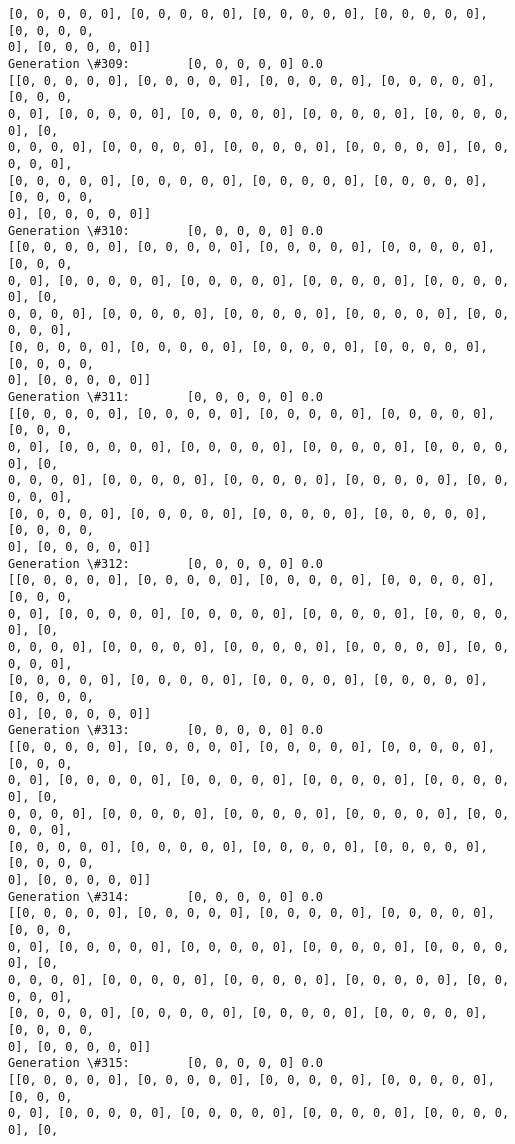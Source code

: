 \documentclass[11pt]{article}
\begin{document}
\begin{Verbatim}[commandchars=\\\{\}]
[0, 0, 0, 0, 0], [0, 0, 0, 0, 0], [0, 0, 0, 0, 0], [0, 0, 0, 0, 0], [0, 0, 0, 0,
0], [0, 0, 0, 0, 0]]
Generation \#309:        [0, 0, 0, 0, 0] 0.0
[[0, 0, 0, 0, 0], [0, 0, 0, 0, 0], [0, 0, 0, 0, 0], [0, 0, 0, 0, 0], [0, 0, 0,
0, 0], [0, 0, 0, 0, 0], [0, 0, 0, 0, 0], [0, 0, 0, 0, 0], [0, 0, 0, 0, 0], [0,
0, 0, 0, 0], [0, 0, 0, 0, 0], [0, 0, 0, 0, 0], [0, 0, 0, 0, 0], [0, 0, 0, 0, 0],
[0, 0, 0, 0, 0], [0, 0, 0, 0, 0], [0, 0, 0, 0, 0], [0, 0, 0, 0, 0], [0, 0, 0, 0,
0], [0, 0, 0, 0, 0]]
Generation \#310:        [0, 0, 0, 0, 0] 0.0
[[0, 0, 0, 0, 0], [0, 0, 0, 0, 0], [0, 0, 0, 0, 0], [0, 0, 0, 0, 0], [0, 0, 0,
0, 0], [0, 0, 0, 0, 0], [0, 0, 0, 0, 0], [0, 0, 0, 0, 0], [0, 0, 0, 0, 0], [0,
0, 0, 0, 0], [0, 0, 0, 0, 0], [0, 0, 0, 0, 0], [0, 0, 0, 0, 0], [0, 0, 0, 0, 0],
[0, 0, 0, 0, 0], [0, 0, 0, 0, 0], [0, 0, 0, 0, 0], [0, 0, 0, 0, 0], [0, 0, 0, 0,
0], [0, 0, 0, 0, 0]]
Generation \#311:        [0, 0, 0, 0, 0] 0.0
[[0, 0, 0, 0, 0], [0, 0, 0, 0, 0], [0, 0, 0, 0, 0], [0, 0, 0, 0, 0], [0, 0, 0,
0, 0], [0, 0, 0, 0, 0], [0, 0, 0, 0, 0], [0, 0, 0, 0, 0], [0, 0, 0, 0, 0], [0,
0, 0, 0, 0], [0, 0, 0, 0, 0], [0, 0, 0, 0, 0], [0, 0, 0, 0, 0], [0, 0, 0, 0, 0],
[0, 0, 0, 0, 0], [0, 0, 0, 0, 0], [0, 0, 0, 0, 0], [0, 0, 0, 0, 0], [0, 0, 0, 0,
0], [0, 0, 0, 0, 0]]
Generation \#312:        [0, 0, 0, 0, 0] 0.0
[[0, 0, 0, 0, 0], [0, 0, 0, 0, 0], [0, 0, 0, 0, 0], [0, 0, 0, 0, 0], [0, 0, 0,
0, 0], [0, 0, 0, 0, 0], [0, 0, 0, 0, 0], [0, 0, 0, 0, 0], [0, 0, 0, 0, 0], [0,
0, 0, 0, 0], [0, 0, 0, 0, 0], [0, 0, 0, 0, 0], [0, 0, 0, 0, 0], [0, 0, 0, 0, 0],
[0, 0, 0, 0, 0], [0, 0, 0, 0, 0], [0, 0, 0, 0, 0], [0, 0, 0, 0, 0], [0, 0, 0, 0,
0], [0, 0, 0, 0, 0]]
Generation \#313:        [0, 0, 0, 0, 0] 0.0
[[0, 0, 0, 0, 0], [0, 0, 0, 0, 0], [0, 0, 0, 0, 0], [0, 0, 0, 0, 0], [0, 0, 0,
0, 0], [0, 0, 0, 0, 0], [0, 0, 0, 0, 0], [0, 0, 0, 0, 0], [0, 0, 0, 0, 0], [0,
0, 0, 0, 0], [0, 0, 0, 0, 0], [0, 0, 0, 0, 0], [0, 0, 0, 0, 0], [0, 0, 0, 0, 0],
[0, 0, 0, 0, 0], [0, 0, 0, 0, 0], [0, 0, 0, 0, 0], [0, 0, 0, 0, 0], [0, 0, 0, 0,
0], [0, 0, 0, 0, 0]]
Generation \#314:        [0, 0, 0, 0, 0] 0.0
[[0, 0, 0, 0, 0], [0, 0, 0, 0, 0], [0, 0, 0, 0, 0], [0, 0, 0, 0, 0], [0, 0, 0,
0, 0], [0, 0, 0, 0, 0], [0, 0, 0, 0, 0], [0, 0, 0, 0, 0], [0, 0, 0, 0, 0], [0,
0, 0, 0, 0], [0, 0, 0, 0, 0], [0, 0, 0, 0, 0], [0, 0, 0, 0, 0], [0, 0, 0, 0, 0],
[0, 0, 0, 0, 0], [0, 0, 0, 0, 0], [0, 0, 0, 0, 0], [0, 0, 0, 0, 0], [0, 0, 0, 0,
0], [0, 0, 0, 0, 0]]
Generation \#315:        [0, 0, 0, 0, 0] 0.0
[[0, 0, 0, 0, 0], [0, 0, 0, 0, 0], [0, 0, 0, 0, 0], [0, 0, 0, 0, 0], [0, 0, 0,
0, 0], [0, 0, 0, 0, 0], [0, 0, 0, 0, 0], [0, 0, 0, 0, 0], [0, 0, 0, 0, 0], [0,

\end{Verbatim}
\end{document}
